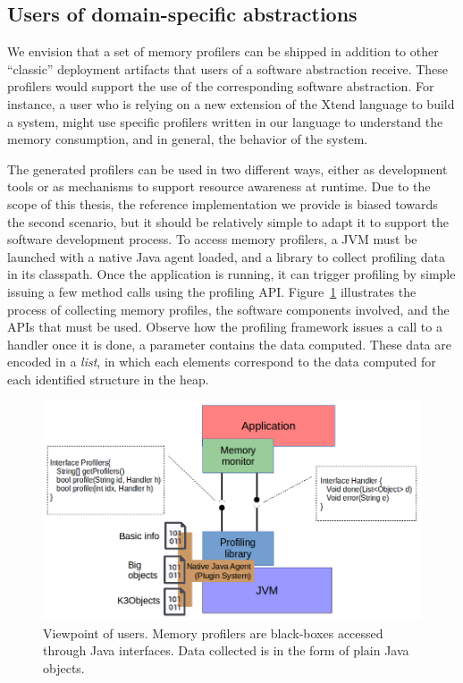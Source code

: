 \subsection{Users of domain-specific abstractions} \label{sec:dsl-tooling-users}

We envision that a set of memory profilers can be shipped in addition to other ``classic'' deployment artifacts that users of a software abstraction receive. 
These profilers would support the use of the corresponding software abstraction.
For instance, a user who is relying on a new extension of the Xtend language to build a system, might use specific profilers written in our language to understand the memory consumption, and in general, the behavior of the system.

The generated profilers can be used in two different ways, either as development tools or as mechanisms to support resource awareness at runtime.
Due to the scope of this thesis, the reference implementation we provide is biased towards the second scenario, but it should be relatively simple to adapt it to support the software development process.
To access memory profilers, a JVM must be launched with a native Java agent loaded, and a library to collect profiling data in its classpath.
Once the application is running, it can trigger profiling by simple issuing a few method calls using the profiling API.
Figure~\ref{fig:user-profiling-library-view} illustrates the process of collecting memory profiles, the software components involved, and the APIs that must be used.
Observe how the profiling framework issues a call to a handler once it is done, a parameter contains the data computed.
These data are encoded in a \textit{list}, in which each elements correspond to the data computed for each identified structure in the heap.

\begin{figure}[!t]
\centering
\includegraphics[scale=0.5]{./chapter6/fig/user-profiler-view.png}
\caption{Viewpoint of users. Memory profilers are black-boxes accessed through Java interfaces. Data collected is in the form of plain Java objects.}\label{fig:user-profiling-library-view}
\end{figure}

